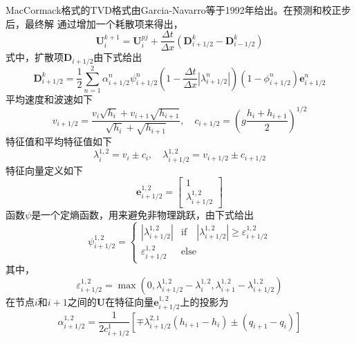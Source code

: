 MacCormack格式的TVD格式由Garcia-Navarro\cite{ref7}等于1992年给出。在预测和校正步后，最终解
通过增加一个耗散项来得出，
\begin{equation}
  \mathbf{U}_{i}^{k+1} =
  \mathbf{U}_{i}^{pj} +
  \frac{\Delta t}{\Delta x}
  \left(
    \mathbf{D}_{i+1/2}^{k} -
    \mathbf{D}_{i-1/2}^{k}
  \right)
\end{equation}
式中，扩散项$\mathbf{D}_{i+1/2}$由下式给出
\begin{equation}
  \mathbf{D}_{i+1/2}^{k} =
  \frac{1}{2}
  \sum_{n=1}^{2}
  \alpha_{i+1/2}^{n}
  \psi_{i+1/2}^{n}
  \left(
    1 - 
    \frac{\Delta t}{\Delta x}
    \left|
    \lambda_{i+1/2}^{n}
    \right|
  \right)
  \left(
    1-\phi_{i+1/2}^{n}
  \right)
  \mathbf{e}_{i+1/2}^{n}
\end{equation}
平均速度和波速如下
\begin{equation}
  v_{i+1/2} = 
  \frac
  {v_{i}\sqrt{h_{i}} + v_{i+1}\sqrt{h_{i+1}}}
  {\sqrt{h_{i}}+\sqrt{h_{i+1}}}
  ,\quad
  c_{i+1/2} =
  \left(
    g 
    \frac{h_{i}+h_{i+1}}{2}
  \right)^{1/2}
\end{equation}
特征值和平均特征值如下
\begin{equation}
  \lambda_{i}^{1,2} = v_{i}\pm c_{i}
  ,\quad
  \lambda_{i+1/2}^{1,2} = v_{i+1/2}\pm c_{i+1/2}
\end{equation}
特征向量定义如下
\begin{equation}
  \mathbf{e}_{i+1/2}^{1,2} 
  =
  \begin{bmatrix}
    1 \\
    \lambda_{i+1/2}^{1,2}
  \end{bmatrix}
\end{equation}
函数$\psi$是一个定熵函数，用来避免非物理跳跃，由下式给出
\begin{equation}
  \psi_{i+1/2}^{1,2} =
  \begin{cases}
    |\lambda_{i+1/2}^{1,2}| & \mathrm{if} \quad |\lambda_{i+1/2}^{1,2}| \ge \varepsilon_{i+1/2}^{1,2} \\
    \varepsilon_{i+1/2}^{1,2} & \mathrm{else}
  \end{cases}
\end{equation}
其中，
\begin{equation}
\varepsilon_{i+1/2}^{1,2} =
\max 
\left(
  0,
  \lambda_{i+1/2}^{1,2} - \lambda_{i}^{1,2},
  \lambda_{i+1}^{1,2} - \lambda_{i+1/2}^{1,2}
\right)
\end{equation}
在节点$i$和$i+1$之间的$\mathbf{U}$在特征向量$\mathbf{e}_{i+1/2}^{1,2}$上的投影为
\begin{equation}
\alpha_{i+1/2}^{1,2} = 
\frac{1}{2c_{i+1/2}^{1}}
\left[
  \mp\lambda_{i+1/2}^{2,1}(h_{i+1}-h_{i})
  \pm
  (q_{i+1} - q_{i})
\right]
\end{equation}
